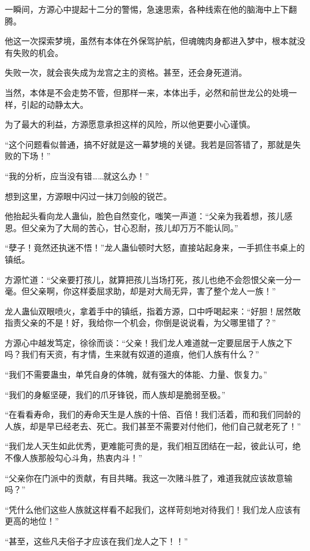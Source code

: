 \begin{this_body}
一瞬间，方源心中提起十二分的警惕，急速思索，各种线索在他的脑海中上下翻腾。

他这一次探索梦境，虽然有本体在外保驾护航，但魂魄肉身都进入梦中，根本就没有失败的机会。

失败一次，就会丧失成为龙宫之主的资格。甚至，还会身死道消。

当然，本体是不会走势不管，但那样一来，本体出手，必然和前世龙公的处境一样，引起的动静太大。

为了最大的利益，方源愿意承担这样的风险，所以他更要小心谨慎。

“这个问题看似普通，搞不好就是这一幕梦境的关键。我若是回答错了，那就是失败的下场！”

“我的分析，应当没有错……就这么办！”

想到这里，方源眼中闪过一抹刀剑般的锐芒。

他抬起头看向龙人蛊仙，脸色自然变化，嗤笑一声道：“父亲为我着想，孩儿感恩。但父亲为了大局的苦心，甘心忍耐，孩儿却万万不能认同。”

“孽子！竟然还执迷不悟！”龙人蛊仙顿时大怒，直接站起身来，一手抓住书桌上的镇纸。

方源忙道：“父亲要打孩儿，就算把孩儿当场打死，孩儿也绝不会怨恨父亲一分一毫。但父亲啊，你这样委屈求助，却是对大局无异，害了整个龙人一族！”

龙人蛊仙双眼喷火，拿着手中的镇纸，指着方源，口中呼喝起来：“好胆！居然敢指责父亲的不是！好，我给你一个机会，你倒是说说看，为父哪里错了？”

方源心中越发笃定，徐徐而谈：“父亲！我们龙人难道就一定要屈居于人族之下吗？我们有天资，有才情，生来就有奴道的道痕，他们人族有什么？”

“我们不需要蛊虫，单凭自身的体魄，就有强大的体能、力量、恢复力。”

“我们的身躯坚硬，我们的爪牙锋锐，而人族却是脆弱至极。”

“在看看寿命，我们的寿命天生是人族的十倍、百倍！我们活着，而和我们同龄的人族，却是早已经老去、死亡。我们甚至不需要对付他们，他们自己就老死了！”

“我们龙人天生如此优秀，更难能可贵的是，我们相互团结在一起，彼此认可，绝不像人族那般勾心斗角，热衷内斗！”

“父亲你在门派中的贡献，有目共睹。我这一次赌斗胜了，难道我就应该故意输吗？”

“凭什么他们这些人族就这样看不起我们，这样苛刻地对待我们！我们龙人应该有更高的地位！”

“甚至，这些凡夫俗子才应该在我们龙人之下！！”


\end{this_body}
